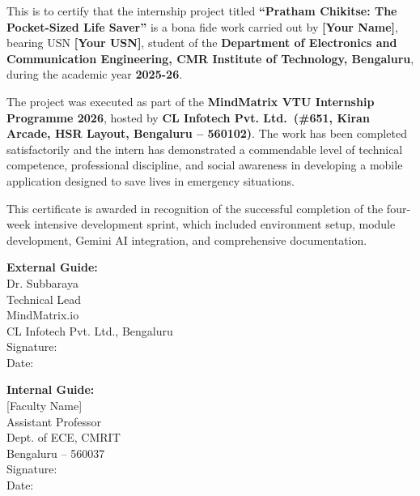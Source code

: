 \documentclass[12pt,a4paper]{report}
\begin{document}
This is to certify that the internship project titled \textbf{``Pratham Chikitse: The Pocket-Sized Life Saver''} is a bona fide work carried out by \textbf{[Your Name]}, bearing USN \textbf{[Your USN]}, student of the \textbf{Department of Electronics and Communication Engineering, CMR Institute of Technology, Bengaluru}, during the academic year \textbf{2025-26}.

\vspace{0.5cm}

The project was executed as part of the \textbf{MindMatrix VTU Internship Programme 2026}, hosted by \textbf{CL Infotech Pvt. Ltd.\ (\#651, Kiran Arcade, HSR Layout, Bengaluru -- 560102)}. The work has been completed satisfactorily and the intern has demonstrated a commendable level of technical competence, professional discipline, and social awareness in developing a mobile application designed to save lives in emergency situations.

\vspace{0.5cm}

This certificate is awarded in recognition of the successful completion of the four-week intensive development sprint, which included environment setup, module development, Gemini AI integration, and comprehensive documentation.

\vspace{3cm}

\noindent
\begin{minipage}[t]{0.45\textwidth}
    \textbf{External Guide:} \\[0.3cm]
    Dr. Subbaraya \\
    Technical Lead \\
    MindMatrix.io \\
    CL Infotech Pvt. Ltd., Bengaluru \\[1cm]
    Signature: \underline{\hspace{4cm}} \\
    Date: \underline{\hspace{4cm}}
\end{minipage}
\hfill
\begin{minipage}[t]{0.45\textwidth}
    \textbf{Internal Guide:} \\[0.3cm]
    [Faculty Name] \\
    Assistant Professor \\
    Dept. of ECE, CMRIT \\
    Bengaluru -- 560037 \\[1cm]
    Signature: \underline{\hspace{4cm}} \\
    Date: \underline{\hspace{4cm}}
\end{minipage}
\end{document}
